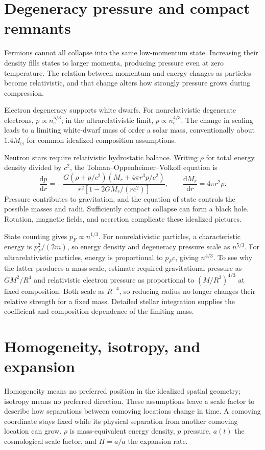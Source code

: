 \documentclass[11pt,oneside]{book}
\newcommand{\dd}{\mathrm{d}}
\newcommand{\od}[2]{\frac{\dd #1}{\dd #2}}
\theoremstyle{reviewstyle}
\begin{document}
\section{Degeneracy pressure and compact remnants}
Fermions cannot all collapse into the same low-momentum state. Increasing their density fills states to larger momenta, producing pressure even at zero temperature. The relation between momentum and energy changes as particles become relativistic, and that change alters how strongly pressure grows during compression.

Electron degeneracy supports white dwarfs. For nonrelativistic degenerate electrons, $p\propto n_e^{5/3}$; in the ultrarelativistic limit, $p\propto n_e^{4/3}$. The change in scaling leads to a limiting white-dwarf mass of order a solar mass, conventionally about $1.4M_\odot$ for common idealized composition assumptions.

Neutron stars require relativistic hydrostatic balance. Writing $\rho$ for total energy density divided by $c^2$, the Tolman--Oppenheimer--Volkoff equation is
\begin{equation}
\od{p}{r}=-\frac{G(\rho+p/c^2)(M_r+4\pi r^3p/c^2)}{r^2[1-2GM_r/(rc^2)]},\qquad
\od{M_r}{r}=4\pi r^2\rho.
\end{equation}
Pressure contributes to gravitation, and the equation of state controls the possible masses and radii. Sufficiently compact collapse can form a black hole. Rotation, magnetic fields, and accretion complicate these idealized pictures.

State counting gives $p_F\propto n^{1/3}$. For nonrelativistic particles, a characteristic energy is $p_F^2/(2m)$, so energy density and degeneracy pressure scale as $n^{5/3}$. For ultrarelativistic particles, energy is proportional to $p_Fc$, giving $n^{4/3}$. To see why the latter produces a mass scale, estimate required gravitational pressure as $GM^2/R^4$ and relativistic electron pressure as proportional to $(M/R^3)^{4/3}$ at fixed composition. Both scale as $R^{-4}$, so reducing radius no longer changes their relative strength for a fixed mass. Detailed stellar integration supplies the coefficient and composition dependence of the limiting mass.

\section{Homogeneity, isotropy, and expansion}
Homogeneity means no preferred position in the idealized spatial geometry; isotropy means no preferred direction. These assumptions leave a scale factor to describe how separations between comoving locations change in time. A comoving coordinate stays fixed while its physical separation from another comoving location can grow. $\rho$ is mass-equivalent energy density, $p$ pressure, $a(t)$ the cosmological scale factor, and $H=\dot a/a$ the expansion rate.
\end{document}
